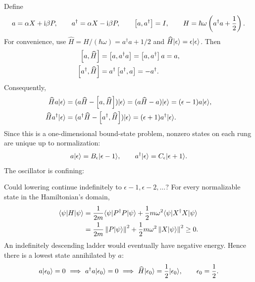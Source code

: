 Define
\[
 a=\alpha X+\mathrm{i}\beta P,\qquad a^\dagger=\alpha X-\mathrm{i}\beta P,
 \qquad\left[a,a^\dagger\right]=I,
 \qquad H=\hbar\omega\left(a^\dagger a+\frac12\right).
\]
For convenience, use $\widehat H=H/(\hbar\omega)=a^\dagger a+1/2$ and
$\widehat H\lvert \epsilon\rangle=\epsilon\lvert \epsilon\rangle$. Then
\begin{align*}
 \left[a,\widehat H\right]
 &=\left[a,a^\dagger a\right]=\left[a,a^\dagger\right]a=a,\\
 \left[a^\dagger,\widehat H\right]
 &=a^\dagger\left[a^\dagger,a\right]=-a^\dagger.
\end{align*}
Consequently,
\begin{align*}
 \widehat H a\lvert \epsilon\rangle
 &=(a\widehat H-\left[a,\widehat H\right])\lvert \epsilon\rangle
 =(a\widehat H-a)\lvert \epsilon\rangle
 =(\epsilon-1)a\lvert \epsilon\rangle,\\
 \widehat H a^\dagger\lvert \epsilon\rangle
 &=(a^\dagger\widehat H-\left[a^\dagger,\widehat H\right])\lvert \epsilon\rangle
 =(\epsilon+1)a^\dagger\lvert \epsilon\rangle.
\end{align*}
Since this is a one-dimensional bound-state problem, nonzero states on
each rung are unique up to normalization:
\[
 a\lvert \epsilon\rangle=B_\epsilon\lvert \epsilon-1\rangle,\qquad
 a^\dagger\lvert \epsilon\rangle=C_\epsilon\lvert \epsilon+1\rangle.
\]
The oscillator is confining:
\begin{center}
\end{center}
Could lowering continue indefinitely to $\epsilon-1,\epsilon-2,\ldots$?
For every normalizable state in the Hamiltonian's domain,
\begin{align*}
 \langle \psi\rvert H\lvert \psi\rangle
 &=\frac1{2m}\langle \psi\rvert P^\dagger P\lvert \psi\rangle
       +\frac12m\omega^2\langle \psi\rvert X^\dagger X\lvert \psi\rangle\\
 &=\frac1{2m}\left\lVert P\lvert \psi\rangle\right\rVert^2
       +\frac12m\omega^2\left\lVert X\lvert \psi\rangle\right\rVert^2\ge0.
\end{align*}
An indefinitely descending ladder would eventually have negative energy.
Hence there is a lowest state annihilated by $a$:
\[
 a\lvert \epsilon_0\rangle=0\ \Longrightarrow\
 a^\dagger a\lvert \epsilon_0\rangle=0\ \Longrightarrow\
 \widehat H\lvert \epsilon_0\rangle=\frac12\lvert \epsilon_0\rangle,\qquad\epsilon_0=\frac12.
\]
